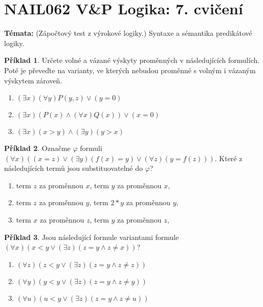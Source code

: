 \documentclass[a4paper]{article}
\theoremstyle{definition}
\newtheorem{problem}{Příklad}
\begin{document}
\section*{NAIL062 V\&P Logika: 7. cvičení}


\textbf{Témata:}
(Zápočtový test z výrokové logiky.) Syntaxe a sémantika predikátové logiky.


\medskip\begin{problem}
    Určete volné a vázané výskyty proměnných v následujících formulích. Poté je převeďte na varianty, ve kterých nebudou proměnné s volným i vázaným výskytem zároveň.
    \begin{enumerate}
       \item $(\exists x)(\forall y)P(y,z) \vee (y=0)$
       \item $(\exists x)(P(x) \wedge (\forall x)Q(x)) \vee (x=0)$
       \item $(\exists x)(x>y) \wedge (\exists y)(y>x)$
    \end{enumerate}
    \end{problem}
    
    \medskip\begin{problem}
    Označme $\varphi$ formuli $(\forall x)((x=z) \vee (\exists y)(f(x)=y) \vee (\forall z)(y=f(z)))$. Které z následujících termů jsou substituovatelné do $\varphi$?
    \begin{enumerate}
       \item term $z$ za proměnnou $x$, term $y$ za proměnnou $x$,
       \item term $z$ za proměnnou $y$, term $2*y$ za proměnnou $y$,
       \item term $x$ za proměnnou $z$, term $y$ za proměnnou $z$,
    \end{enumerate}
\end{problem}
    
\medskip\begin{problem}
    Jsou následující formule variantami formule $(\forall x)(x<y \vee (\exists z)(z=y \wedge z\ne x))$?
    \begin{enumerate}
    \item $(\forall z)(z<y \vee (\exists z)(z=y \wedge z\ne z))$
    \item $(\forall y)(y<y \vee (\exists z)(z=y \wedge z\ne y))$
    \item $(\forall u)(u<y \vee (\exists z)(z=y \wedge z\ne u))$
    \end{enumerate}
\end{problem}
    
\end{document}
